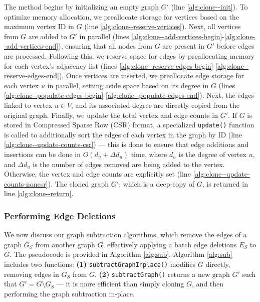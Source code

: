 The method begins by initializing an empty graph $G'$ (line \ref{alg:clone--init}). To optimize memory allocation, we preallocate storage for vertices based on the maximum vertex ID in $G$ (line \ref{alg:clone--reserve-vertices}). Next, all vertices from $G$ are added to $G'$ in parallel (lines \ref{alg:clone--add-vertices-begin}-\ref{alg:clone--add-vertices-end}), ensuring that all nodes from $G$ are present in $G'$ before edges are processed. Following this, we reserve space for edges by preallocating memory for each vertex’s adjacency list (lines \ref{alg:clone--reserve-edges-begin}-\ref{alg:clone--reserve-edges-end}). Once vertices are inserted, we preallocate edge storage for each vertex $u$ in parallel, setting aside space based on its degree in $G$ (lines \ref{alg:clone--populate-edges-begin}-\ref{alg:clone--populate-edges-end}). Next, the edges linked to vertex $u \in V$, and its associated degree are directly copied from the original graph. Finally, we update the total vertex and edge counts in $G'$. If $G$ is stored in Compressed Sparse Row (CSR) format, a specialized \texttt{update()} function is called to additionally sort the edges of each vertex in the graph by ID (line \ref{alg:clone--update-counts-csr}) --- this is done to ensure that edge additions and insertions can be done in $O(d_u + \Delta d_u)$ time, where $d_u$ is the degree of vertex $u$, and $\Delta d_u$ is the number of edges removed are being added to the vertex. Otherwise, the vertex and edge counts are explicitly set (line \ref{alg:clone--update-counts-noncsr}). The cloned graph $G'$, which is a deep-copy of $G$, is returned in line \ref{alg:clone--return}.




\subsubsection{Performing Edge Deletions}
\label{sec:sub}

We now discuss our graph subtraction algorithms, which remove the edges of a graph $G_S$ from another graph $G$, effectively applying a batch edge deletions $E_S$ to $G$. The pseudocode is provided in Algorithm \ref{alg:sub}. Algorithm \ref{alg:sub} includes two functions: \textbf{(1)} \texttt{subtractGraphInplace()} modifies $G$ directly, removing edges in $G_S$ from $G$. \textbf{(2)} \texttt{subtractGraph()} returns a new graph $G'$ such that $G' = G \setminus G_S$ --- it is more efficient than simply cloning $G$, and then performing the graph subtraction in-place.

